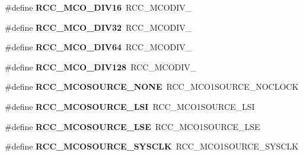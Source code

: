 \begin{DoxyCompactItemize}
\item 
\#define {\bfseries R\+C\+C\+\_\+\+M\+C\+O\+\_\+\+D\+I\+V16}~R\+C\+C\+\_\+\+M\+C\+O\+D\+I\+V\+\_\hypertarget{group___h_a_l___r_c_c___aliased_ga4e8e30ec40f362037055d5977a9e2ea0}{}\label{group___h_a_l___r_c_c___aliased_ga4e8e30ec40f362037055d5977a9e2ea0}

\item 
\#define {\bfseries R\+C\+C\+\_\+\+M\+C\+O\+\_\+\+D\+I\+V32}~R\+C\+C\+\_\+\+M\+C\+O\+D\+I\+V\+\_\hypertarget{group___h_a_l___r_c_c___aliased_ga26c54546e41690456e3a57cd46a3b16a}{}\label{group___h_a_l___r_c_c___aliased_ga26c54546e41690456e3a57cd46a3b16a}

\item 
\#define {\bfseries R\+C\+C\+\_\+\+M\+C\+O\+\_\+\+D\+I\+V64}~R\+C\+C\+\_\+\+M\+C\+O\+D\+I\+V\+\_\hypertarget{group___h_a_l___r_c_c___aliased_ga3e2f0bbc95937a013cdb3cc6bec61fe8}{}\label{group___h_a_l___r_c_c___aliased_ga3e2f0bbc95937a013cdb3cc6bec61fe8}

\item 
\#define {\bfseries R\+C\+C\+\_\+\+M\+C\+O\+\_\+\+D\+I\+V128}~R\+C\+C\+\_\+\+M\+C\+O\+D\+I\+V\+\_\hypertarget{group___h_a_l___r_c_c___aliased_ga13db6fb3b4264a8fff9f671faf393f1b}{}\label{group___h_a_l___r_c_c___aliased_ga13db6fb3b4264a8fff9f671faf393f1b}

\item 
\#define {\bfseries R\+C\+C\+\_\+\+M\+C\+O\+S\+O\+U\+R\+C\+E\+\_\+\+N\+O\+NE}~R\+C\+C\+\_\+\+M\+C\+O1\+S\+O\+U\+R\+C\+E\+\_\+\+N\+O\+C\+L\+O\+CK\hypertarget{group___h_a_l___r_c_c___aliased_ga55362c6bb39a405d997b64cf8db9709e}{}\label{group___h_a_l___r_c_c___aliased_ga55362c6bb39a405d997b64cf8db9709e}

\item 
\#define {\bfseries R\+C\+C\+\_\+\+M\+C\+O\+S\+O\+U\+R\+C\+E\+\_\+\+L\+SI}~R\+C\+C\+\_\+\+M\+C\+O1\+S\+O\+U\+R\+C\+E\+\_\+\+L\+SI\hypertarget{group___h_a_l___r_c_c___aliased_ga71ac33c61f4246489cc1c34bebe9b45d}{}\label{group___h_a_l___r_c_c___aliased_ga71ac33c61f4246489cc1c34bebe9b45d}

\item 
\#define {\bfseries R\+C\+C\+\_\+\+M\+C\+O\+S\+O\+U\+R\+C\+E\+\_\+\+L\+SE}~R\+C\+C\+\_\+\+M\+C\+O1\+S\+O\+U\+R\+C\+E\+\_\+\+L\+SE\hypertarget{group___h_a_l___r_c_c___aliased_ga830cfeba85393f5a5a2743ad0f373834}{}\label{group___h_a_l___r_c_c___aliased_ga830cfeba85393f5a5a2743ad0f373834}

\item 
\#define {\bfseries R\+C\+C\+\_\+\+M\+C\+O\+S\+O\+U\+R\+C\+E\+\_\+\+S\+Y\+S\+C\+LK}~R\+C\+C\+\_\+\+M\+C\+O1\+S\+O\+U\+R\+C\+E\+\_\+\+S\+Y\+S\+C\+LK\hypertarget{group___h_a_l___r_c_c___aliased_ga250215c0f82d63c001f1a19f6baeaee4}{}\label{group___h_a_l___r_c_c___aliased_ga250215c0f82d63c001f1a19f6baeaee4}


\end{DoxyCompactItemize}
